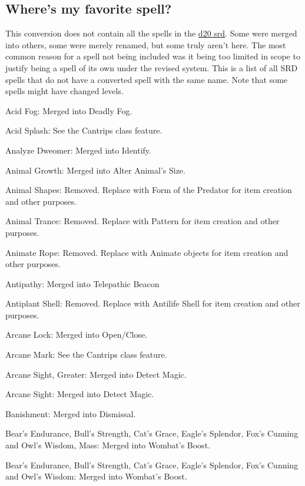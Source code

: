 \newpage
\subsection{Where's my favorite spell?}
\label{sec:MissingSpells}
This conversion does not contain all the spells in the \href{http://www.wizards.com/default.asp?x=d20/article/srd35}{d20 srd}.
Some were merged into others, some were merely renamed, but some truly aren't here. 
The most common reason for a spell not being included was it being too limited in scope to justify being a spell of its own under the revised system.
This is a list of all SRD spells that do not have a converted spell with the same name.
Note that some spells might have changed levels.
{\small
\begin{list}{}{\leftmargin=1em}
 \item Acid Fog: Merged into Deadly Fog.
 \item Acid Splash: See the Cantrips class feature.
 \item Analyze Dweomer: Merged into Identify.
 \item Animal Growth: Merged into Alter Animal's Size.
 \item Animal Shapes: Removed. Replace with Form of the Predator for item creation and other purposes.
 \item Animal Trance: Removed. Replace with Pattern for item creation and other purposes.
 \item Animate Rope: Removed. Replace with Animate objects for item creation and other purposes.
 \item Antipathy: Merged into Telepathic Beacon
 \item Antiplant Shell: Removed. Replace with Antilife Shell for item creation and other purposes.
 \item Arcane Lock: Merged into Open/Close.
 \item Arcane Mark: See the Cantrips class feature.
 \item Arcane Sight, Greater: Merged into Detect Magic.
 \item Arcane Sight: Merged into Detect Magic.
 \item Banishment: Merged into Dismissal.
 \item Bear's Endurance, Bull's Strength, Cat's Grace, Eagle's Splendor, Fox's Cunning and Owl's Wisdom, Mass: Merged into Wombat's Boost.
 \item Bear's Endurance, Bull's Strength, Cat's Grace, Eagle's Splendor, Fox's Cunning and Owl's Wisdom: Merged into Wombat's Boost.

\end{list}}
